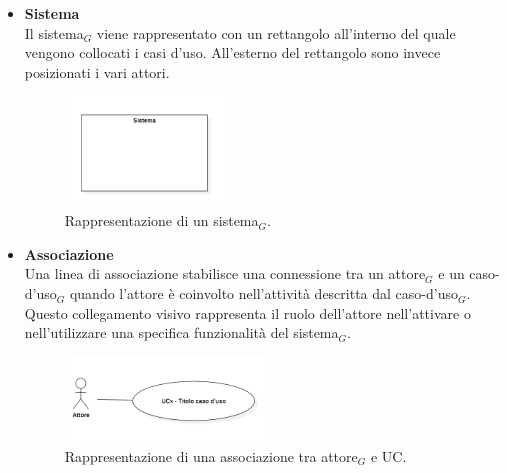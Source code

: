 \documentclass[10pt]{article}
\begin{document}
\begin{justify}
\begin{itemize}
            \item \textbf{Sistema}\\
            Il sistema$_G$ viene rappresentato con un rettangolo all'interno del quale vengono collocati i casi d'uso. All'esterno del rettangolo sono invece posizionati i vari attori.
            \begin{figure}[H]
            \centering
            \includegraphics[width=0.4\textwidth]{Sistema.PNG}
            \caption{Rappresentazione di un sistema$_G$.}
            \end{figure}

            \item \textbf{Associazione}\\
            Una linea di associazione stabilisce una connessione tra un attore$_G$ e un caso-d'uso$_G$ quando l'attore è coinvolto nell'attività descritta dal caso-d'uso$_G$. Questo collegamento visivo rappresenta il ruolo dell'attore nell'attivare o nell'utilizzare una specifica funzionalità del sistema$_G$.
            \begin{figure}[H]
            \centering
            \includegraphics[width=0.5\textwidth]{AssociazioneAttore.PNG}
            \caption{Rappresentazione di una associazione tra attore$_G$ e UC.}
            \end{figure}


\end{itemize}
\end{justify}
\end{document}
